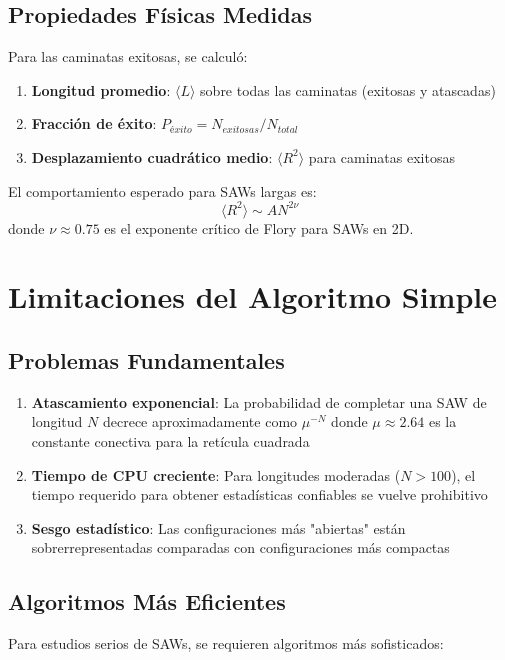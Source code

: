 \documentclass[11pt,a4paper]{article}
\begin{document}
\subsection{Propiedades Físicas Medidas}
Para las caminatas exitosas, se calculó:

\begin{enumerate}
    \item \textbf{Longitud promedio}: $\langle L \rangle$ sobre todas las caminatas (exitosas y atascadas)
    \item \textbf{Fracción de éxito}: $P_{éxito} = N_{exitosas}/N_{total}$
    \item \textbf{Desplazamiento cuadrático medio}: $\langle R^2 \rangle$ para caminatas exitosas
\end{enumerate}

El comportamiento esperado para SAWs largas es:
\begin{equation}
    \langle R^2 \rangle \sim A N^{2\nu}
\end{equation}
donde $\nu \approx 0.75$ es el exponente crítico de Flory para SAWs en 2D.

\section{Limitaciones del Algoritmo Simple}

\subsection{Problemas Fundamentales}
\begin{enumerate}
    \item \textbf{Atascamiento exponencial}: La probabilidad de completar una SAW de longitud $N$ decrece aproximadamente como $\mu^{-N}$ donde $\mu \approx 2.64$ es la constante conectiva para la retícula cuadrada
    \item \textbf{Tiempo de CPU creciente}: Para longitudes moderadas ($N > 100$), el tiempo requerido para obtener estadísticas confiables se vuelve prohibitivo
    \item \textbf{Sesgo estadístico}: Las configuraciones más "abiertas" están sobrerrepresentadas comparadas con configuraciones más compactas
\end{enumerate}

\subsection{Algoritmos Más Eficientes}
Para estudios serios de SAWs, se requieren algoritmos más sofisticados:
\end{document}
